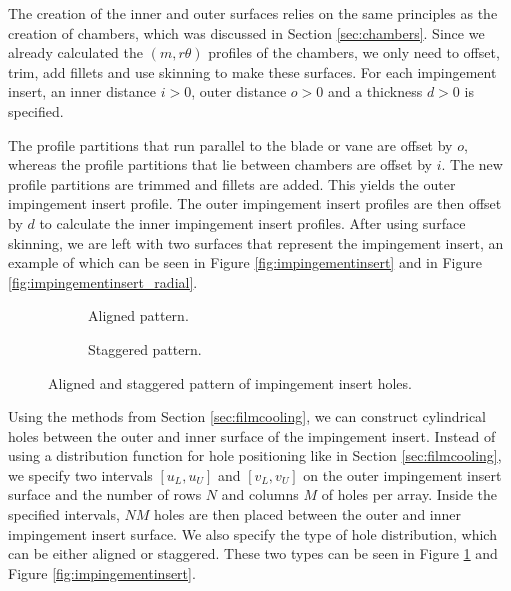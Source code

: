 \documentclass[a4paper, 11pt]{report}
\theoremstyle{definition}
\begin{document}
	The creation of the inner and outer surfaces relies on the same principles as the creation of chambers, which was discussed in Section \ref{sec:chambers}. Since we already calculated the $(m, r\theta)$ profiles of the chambers, we only need to offset, trim, add fillets and use skinning to make these surfaces. For each impingement insert, an inner distance $i > 0$, outer distance $o > 0$ and a thickness $d > 0$ is specified.

	The profile partitions that run parallel to the blade or vane are offset by $o$, whereas the profile partitions that lie between chambers are offset by $i$. The new profile partitions are trimmed and fillets are added. This yields the outer impingement insert profile. The outer impingement insert profiles are then offset by $d$ to calculate the inner impingement insert profiles. After using surface skinning, we are left with two surfaces that represent the impingement insert, an example of which can be seen in Figure \ref{fig:impingementinsert} and in Figure \ref{fig:impingementinsert_radial}.
	
	\begin{figure}[H]
		\centering
		\begin{subfigure}{.25\textwidth}
			
			\caption{Aligned pattern.}
		\end{subfigure}
		\phantom{aaaaaaaaaaa}
		\begin{subfigure}{.25\textwidth}
			
			\caption{Staggered pattern.}
		\end{subfigure}
		\caption{Aligned and staggered pattern of impingement insert holes.}
		\label{fig:alignedstaggered}
	\end{figure}

	Using the methods from Section \ref{sec:filmcooling}, we can construct cylindrical holes between the outer and inner surface of the impingement insert. Instead of using a distribution function for hole positioning like in Section \ref{sec:filmcooling}, we specify two intervals $[u_L, u_U]$ and $[v_L, v_U]$ on the outer impingement insert surface and the number of rows $N$ and columns $M$ of holes per array. Inside the specified intervals, $NM$ holes are then placed between the outer and inner impingement insert surface. We also specify the type of hole distribution, which can be either aligned or staggered. These two types can be seen in Figure \ref{fig:alignedstaggered} and Figure \ref{fig:impingementinsert}.
\end{document}
